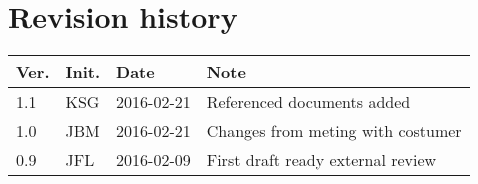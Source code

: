 \chapter*{Revision history}
\label{app:rev_his}

\renewcommand\arraystretch{1.5}
\begin{tabular}{b{1cm} b{1cm} b{2cm} b{8cm}}
    \textbf{Ver.} & \textbf{Init.} & \textbf{Date} & \textbf{Note} \\
    \hline
    1.1 & KSG & 2016-02-21 & Referenced documents added \\
    \hline
    1.0 & JBM & 2016-02-21 & Changes from meting with costumer \\
    \hline
    0.9 & JFL & 2016-02-09 & First draft ready external review \\
\end{tabular}
\renewcommand\arraystretch{1}